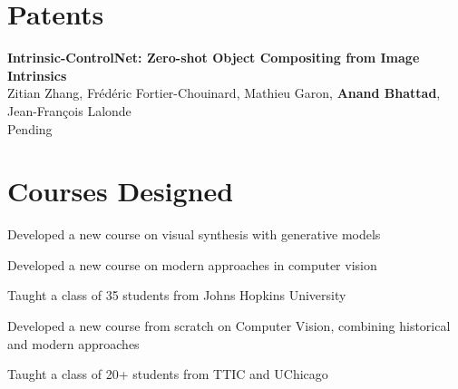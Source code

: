 \section{Patents}
\renewcommand*{\labelenumi}{\theenumi.}
\begin{etaremune}[start=1, leftmargin=20pt]
\item  {\bf Intrinsic-ControlNet: Zero-shot Object Compositing from Image Intrinsics}\\
{Zitian Zhang, Frédéric Fortier-Chouinard, Mathieu Garon, {\bf Anand Bhattad}, Jean-François Lalonde} \\
Pending
\end{etaremune}

\section{Courses Designed}
\begin{list2}
\item Developed a new course on visual synthesis with generative models
\end{list2}
\vspace{1ex}
\begin{list2}
\item Developed a new course on modern approaches in computer vision
\item Taught a class of 35 students from Johns Hopkins University
\end{list2}
\vspace{1ex}
\begin{list2}
\item Developed a new course from scratch on Computer Vision, combining historical and modern approaches
\item Taught a class of 20+ students from TTIC and UChicago
\end{list2}
